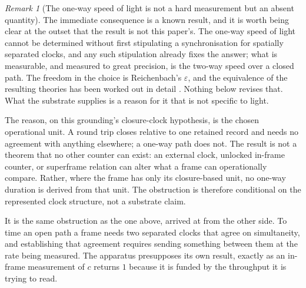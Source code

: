 \documentclass[11pt,a4paper]{article}
\theoremstyle{remark}\newtheorem{remark}[definition]{Remark}
\begin{document}
\begin{remark}[The one-way speed of light is not a hard measurement but an absent
quantity]\label{rem:oneway}
The immediate consequence is a known result, and it is worth being clear at the outset that the
result is not this paper's. The one-way speed of light cannot be determined without first stipulating
a synchronisation for spatially separated clocks, and any such stipulation already fixes the answer;
what is measurable, and measured to great precision, is the two-way speed over a closed path. The
freedom in the choice is Reichenbach's $\varepsilon$, and the equivalence of the resulting theories
has been worked out in detail \citep{reichenbach1958,anderson1998}. Nothing below revises that. What
the substrate supplies is a reason for it that is not specific to light.

The reason, on this grounding's closure-clock hypothesis, is the chosen operational unit. A round
trip closes relative to one retained record and needs no agreement with anything elsewhere; a one-way
path does not. The result is not a theorem that no other counter can exist: an external clock,
unlocked in-frame counter, or superframe relation can alter what a frame can operationally compare.
Rather, where the frame has only its closure-based unit, no one-way duration is derived from that unit.
The obstruction is therefore conditional on the represented clock structure, not a substrate claim.

It is the same obstruction as the one above, arrived at from the other side. To time an open path a
frame needs two separated clocks that agree on simultaneity, and establishing that agreement requires
sending something between them at the rate being measured. The apparatus presupposes its own result,
exactly as an in-frame measurement of $c$ returns $1$ because it is funded by the throughput it is
trying to read.
\end{remark}
\end{document}
